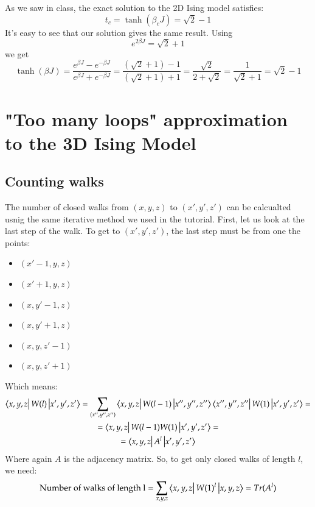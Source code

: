 \documentclass{article}
\begin{document}
As we saw in class, the exact solution to the 2D Ising model satisfies:
\begin{equation}
    t_c = \tanh(\beta_c J) = \sqrt{2} - 1
\end{equation}
It's easy to see that our solution gives the same result. Using
\begin{equation}
    e^{2 \beta J} = \sqrt{2} + 1
\end{equation}
we get
\begin{equation}
    \tanh(\beta J) = \frac{e^{\beta J} - e^{-\beta J}}{e^{\beta J} + e^{-\beta J}} = \frac{(\sqrt{2} + 1) - 1}{(\sqrt{2} + 1) + 1} = \frac{\sqrt{2}}{2 + \sqrt{2}} = \frac{1}{\sqrt{2} + 1} = \sqrt{2} - 1
\end{equation}

\section{"Too many loops" approximation to the 3D Ising Model}
\subsection{Counting walks}
The number of closed walks from $(x,y,z)$ to $(x',y',z')$ can be calcualted usnig the same iterative method we used in the tutorial. First, let us look at the last step of the walk. To get to $(x',y',z')$, the last step must be from one the points:
\begin{itemize}
    \item $(x'-1,y,z)$
    \item $(x'+1,y,z)$
    \item $(x,y'-1,z)$
    \item $(x,y'+1,z)$
    \item $(x,y,z'-1)$
    \item $(x,y,z'+1)$
\end{itemize}
Which means:
\begin{equation}
\begin{gathered}
    \bra{x, y, z}W(l)\ket{x', y', z'} = \sum_{(x'',y'',z'')}
    \bra{x, y, z}W(l-1)\ket{x'', y'', z''}
    \bra{x'', y'', z''}W(1)\ket{x', y', z'} = \\ =
    \bra{x, y, z}W(l-1)W(1)\ket{x', y', z'} = \\
    = \bra{x, y, z}A^l\ket{x', y', z'}
\end{gathered}
\end{equation}
Where again $A$ is the adjacency matrix. So, to get only closed walks of length $l$, we need:
\begin{equation}
    \text{Number of walks of length l} = \sum_{x, y, z}\bra{x, y, z}W(1)^l\ket{x, y, z} = Tr(A^l)
\end{equation}
\end{document}
